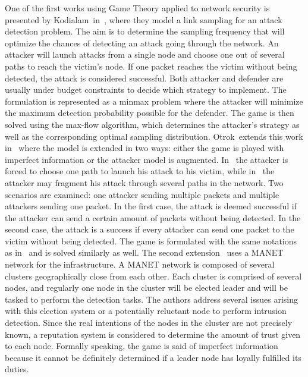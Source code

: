  One of the first works using Game Theory applied to network security is presented by Kodialam~\etal in~\cite{MuraliKodialam2003}, where they model a link sampling for an attack detection problem.
 The aim is to determine the sampling frequency that will optimize the chances of detecting an attack going through the network.
 An attacker will launch attacks from a single node and choose one out of several paths to reach the victim's node.
 If one packet reaches the victim without being detected, the attack is considered successful.
 Both attacker and defender are usually under budget constraints to decide which strategy to implement.
 The formulation is represented as a minmax problem where the attacker will minimize the maximum detection probability possible for the defender.
 The game is then solved using the max-flow algorithm, which determines the attacker's strategy as well as the corresponding optimal sampling distribution.
 Otrok~\etal extends this work in~\cite{otrok1,otrok2} where the model is extended in two ways: either the game is played with imperfect information or the attacker model is augmented.
 In~\cite{MuraliKodialam2003} the attacker is forced to choose one path to launch his attack to his victim, while in~\cite{otrok1} the attacker may fragment his attack through several paths in the network.
 Two scenarios are examined: one attacker sending multiple packets and multiple attackers sending one packet.
 In the first case, the attack is deemed successful if the attacker can send a certain amount of packets without being detected.
 In the second case, the attack is a success if every attacker can send one packet to the victim without being detected.
 The game is formulated with the same notations as in~\cite{MuraliKodialam2003} and is solved similarly as well.
 The second extension~\cite{otrok2} uses a MANET network for the infrastructure.
 A MANET network is composed of several clusters geographically close from each other.
 Each cluster is comprised of several nodes, and regularly one node in the cluster will be elected leader and will be tasked to perform the detection tasks. The authors address several issues arising with this election system or a potentially reluctant node to perform intrusion detection.
 Since the real intentions of the nodes in the cluster are not precisely known, a reputation system is considered to determine the amount of trust given to each node.
 Formally speaking, the game is said of imperfect information because it cannot be definitely determined if a leader node has loyally fulfilled its duties.
 
